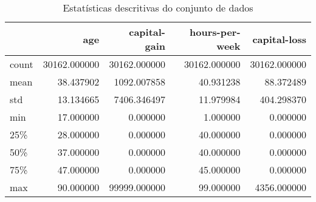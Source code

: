 \begin{table}
\centering
\caption{Estatísticas descritivas do conjunto de dados}
\label{tbl:descriptive_statistics}
\begin{tabular}{lrrrr}
\toprule
{} &           age &  capital-gain &  hours-per-week &  capital-loss \\
\midrule
count &  30162.000000 &  30162.000000 &    30162.000000 &  30162.000000 \\
mean  &     38.437902 &   1092.007858 &       40.931238 &     88.372489 \\
std   &     13.134665 &   7406.346497 &       11.979984 &    404.298370 \\
min   &     17.000000 &      0.000000 &        1.000000 &      0.000000 \\
25\%   &     28.000000 &      0.000000 &       40.000000 &      0.000000 \\
50\%   &     37.000000 &      0.000000 &       40.000000 &      0.000000 \\
75\%   &     47.000000 &      0.000000 &       45.000000 &      0.000000 \\
max   &     90.000000 &  99999.000000 &       99.000000 &   4356.000000 \\
\bottomrule
\end{tabular}
\end{table}
